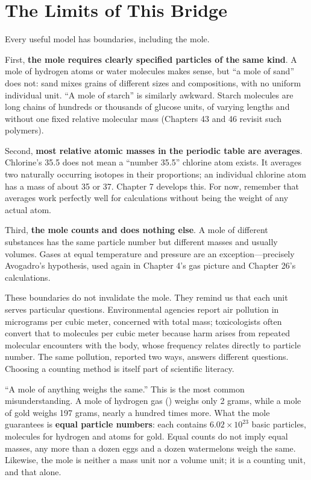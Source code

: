 \section{The Limits of This Bridge}

Every useful model has boundaries, including the mole.

First, \textbf{the mole requires clearly specified particles of the same kind}. A mole of hydrogen atoms or water molecules makes sense, but ``a mole of sand'' does not: sand mixes grains of different sizes and compositions, with no uniform individual unit. ``A mole of starch'' is similarly awkward. Starch molecules are long chains of hundreds or thousands of glucose units, of varying lengths and without one fixed relative molecular mass (Chapters 43 and 46 revisit such polymers).

Second, \textbf{most relative atomic masses in the periodic table are averages}. Chlorine's 35.5 does not mean a ``number 35.5'' chlorine atom exists. It averages two naturally occurring isotopes in their proportions; an individual chlorine atom has a mass of about 35 or 37. Chapter 7 develops this. For now, remember that averages work perfectly well for calculations without being the weight of any actual atom.

Third, \textbf{the mole counts and does nothing else}. A mole of different substances has the same particle number but different masses and usually volumes. Gases at equal temperature and pressure are an exception---precisely Avogadro's hypothesis, used again in Chapter 4's gas picture and Chapter 26's calculations.

These boundaries do not invalidate the mole. They remind us that each unit serves particular questions. Environmental agencies report air pollution in micrograms per cubic meter, concerned with total mass; toxicologists often convert that to molecules per cubic meter because harm arises from repeated molecular encounters with the body, whose frequency relates directly to particle number. The same pollution, reported two ways, answers different questions. Choosing a counting method is itself part of scientific literacy.

\begin{wuqu}
``A mole of anything weighs the same.'' This is the most common misunderstanding. A mole of hydrogen gas () weighs only 2 grams, while a mole of gold weighs 197 grams, nearly a hundred times more. What the mole guarantees is \textbf{equal particle numbers}: each contains $6.02\times 10^{23}$ basic particles, molecules for hydrogen and atoms for gold. Equal counts do not imply equal masses, any more than a dozen eggs and a dozen watermelons weigh the same. Likewise, the mole is neither a mass unit nor a volume unit; it is a counting unit, and that alone.
\end{wuqu}


